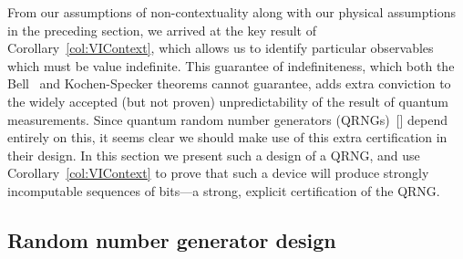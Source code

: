 \documentclass[11pt, a4paper]{article}
\theoremstyle{definition}
\begin{document}
From our assumptions of non-contextuality along with our physical assumptions in the preceding section, we arrived at the key result of Corollary~\ref{col:VIContext}, which allows us to identify particular observables which must be value indefinite.
This guarantee of indefiniteness, which both the Bell~\cite{bell-66} and Kochen-Specker theorems cannot guarantee, adds extra conviction to the widely accepted (but not proven) unpredictability of the result of quantum measurements.
Since quantum random number generators (QRNGs)~[] depend entirely on this, it seems clear we should make use of this extra certification in their design.
In this section we present such a design of a QRNG, and use Corollary~\ref{col:VIContext} to prove that such a device will produce strongly incomputable sequences of bits---a strong, explicit certification of the QRNG.

\subsection{Random number generator design}
\end{document}
